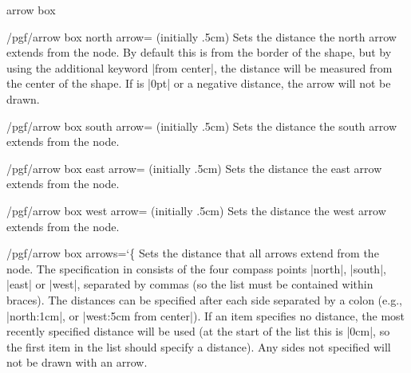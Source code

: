 \begin{shape}{arrow box}
\begin{key}{/pgf/arrow box north arrow= (initially .5cm)}
    Sets the distance the north arrow extends from the node. By default this is
    from the border of the shape, but by using the additional keyword
    |from center|, the distance will be measured from the center of the shape.
    If  is |0pt| or a negative distance, the arrow will not be
    drawn.
\end{key}

\begin{key}{/pgf/arrow box south arrow= (initially .5cm)}
    Sets the distance the south arrow extends from the node.
\end{key}

\begin{key}{/pgf/arrow box east arrow= (initially .5cm)}
    Sets the distance the east arrow extends from the node.
\end{key}

\begin{key}{/pgf/arrow box west arrow= (initially .5cm)}
    Sets the distance the west arrow extends from the node.
\end{key}

\begin{key}{/pgf/arrow box arrows={\ttfamily\char`\{}}
    Sets the distance that all arrows extend from the node. The specification
    in  consists of the four compass points |north|, |south|, |east|
    or |west|, separated by commas (so the list must be contained within
    braces). The distances can be specified after each side separated by a
    colon (e.g., |north:1cm|, or |west:5cm from center|). If an item specifies
    no distance, the most recently specified distance will be used (at the
    start of the list this is |0cm|, so the first item in the list should
    specify a distance). Any sides not specified will not be drawn with an
    arrow.
\end{key}


\end{shape}
